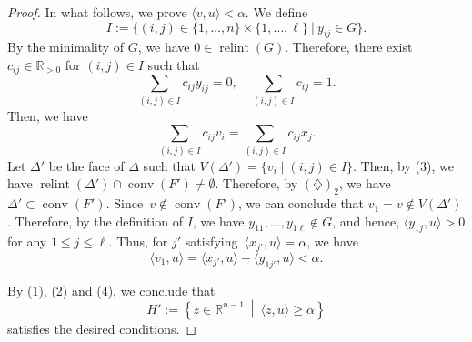 \begin{proof}
In what follows, we prove $\langle v, u \rangle < \alpha$. 
We define 
\[
I := \bigl\{ (i,j) \in \{ 1, \ldots , n\} \times \{ 1 , \ldots, \ell \} \ \big| \  y_{ij} \in G \bigr\}. 
\]
By the minimality of $G$, we have $0 \in \operatorname{relint}(G)$. 
Therefore, there exist $c_{ij} \in \mathbb{R}_{>0}$ for $(i,j) \in I$ such that
\[
\sum _{(i,j) \in I} c_{ij} y_{ij} = 0, \quad \sum _{(i,j) \in I} c_{ij} = 1. 
\]
Then, we have 
\[\tag{3}
\sum _{(i,j) \in I} c_{ij} v_i = \sum _{(i,j) \in I} c_{ij} x_j. 
\]
Let $\Delta '$ be the face of $\Delta$ such that $V(\Delta ') = \{ v_i \mid (i,j) \in I \}$. 
Then, by (3), we have $\operatorname{relint}(\Delta ') \cap \operatorname{conv}(F') \not = \emptyset$. 
Therefore, by $(\diamondsuit)_2$, we have $\Delta' \subset \operatorname{conv}(F')$. 
Since~$v \not \in \operatorname{conv}(F')$, we can conclude that $v_1 = v \not \in V(\Delta ')$. 
Therefore, by the definition of $I$, we have $y_{11}, \ldots , y_{1\ell} \not \in G$, and hence, 
$\langle y_{1j}, u \rangle > 0$ for any $1 \le j \le \ell$. 
Thus, for $j'$ satisfying~$\langle x_{j'}, u \rangle = \alpha$, we have
\[\tag{4}
\langle v_1, u \rangle = \langle x_{j'}, u \rangle - \langle y_{1j'}, u \rangle < \alpha. 
\]

By (1), (2) and (4), we conclude that
\[
H' := \left\{ z \in \mathbb{R}^{n-1} \ \middle | \  \langle z, u \rangle \ge \alpha \right \}
\]
satisfies the desired conditions. 
\end{proof}

